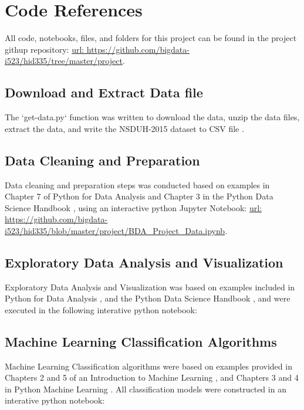 \documentclass[sigconf]{acmart}
\begin{document}

 


\appendix



\section{Code References}

All code, notebooks, files, and folders for this project can be found in the
project githup repository: \url{url:  https://github.com/bigdata-i523/hid335/tree/master/project}.

\subsection{Download and Extract Data file \cite{getdata17}}

The `get-data.py` function was written to download the data, unzip the data
files, extract the data, and write the NSDUH-2015 dataset to CSV file 
\cite{getdata17}.

\subsection{Data Cleaning and Preparation \cite{mckinney17}}

Data cleaning and preparation steps was conducted based on examples in 
Chapter 7 of Python for Data Analysis \cite{mckinney17} and Chapter 3 in 
the Python Data Science Handbook \cite{vanderplas17}, using an interactive 
python Jupyter Notebook: \url{url: https://github.com/bigdata-i523/hid335/blob/master/project/BDA_Project_Data.ipynb}.

\subsection{Exploratory Data Analysis and Visualization\cite{vanderplas17}}

Exploratory Data Analysis and Visualization was based on examples included
in Python for Data Analysis \cite{mckinney17}, and the Python Data Science 
Handbook \cite{vanderplas17}, and were executed in the following interative
python notebook: 


\subsection{Machine Learning Classification Algorithms\cite{muller17, raschka17}}
Machine Learning Classification algorithms were based on examples provided
in Chapters 2 and 5 of an Introduction to Machine Learning \cite{muller17},
and Chapters 3 and 4 in Python Machine Learning \cite{raschka17}. All 
classification models were constructed in an interative python notebook: 
\end{document}
